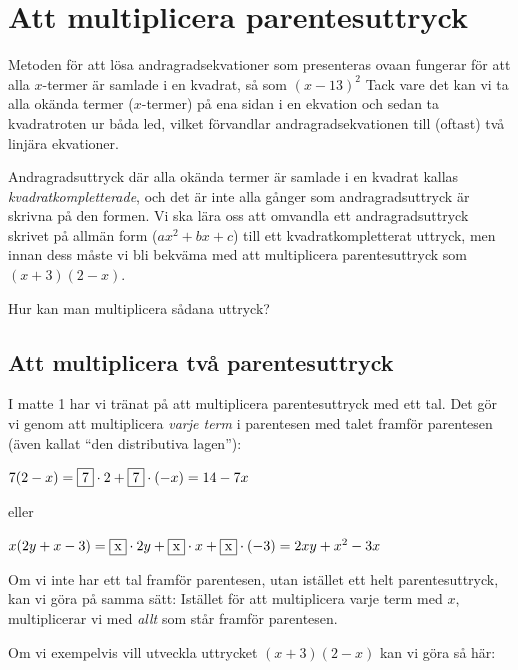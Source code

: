 \section{Att multiplicera parentesuttryck}

Metoden för att lösa andragradsekvationer som presenteras ovaan fungerar för att alla $x$-termer är samlade i en kvadrat, så som $(x - 13)^2$
Tack vare det kan vi ta alla okända termer ($x$-termer) på ena sidan i en ekvation och sedan ta kvadratroten ur båda led, vilket förvandlar andragradsekvationen till (oftast) två linjära ekvationer.

Andragradsuttryck där alla okända termer är samlade i en kvadrat kallas \emph{kvadratkompletterade}, och det är inte alla gånger som andragradsuttryck är skrivna på den formen.
Vi ska lära oss att omvandla ett andragradsuttryck skrivet på allmän form ($ax^2 + bx + c$) till ett kvadratkompletterat uttryck, men innan dess måste vi bli bekväma med att multiplicera parentesuttryck som $(x+3)(2-x)$.

Hur kan man multiplicera sådana uttryck?

\subsection{Att multiplicera två parentesuttryck}

I matte 1 har vi tränat på att multiplicera parentesuttryck med ett tal.
Det gör vi genom att multiplicera \emph{varje term} i parentesen med talet framför parentesen (även kallat ``den distributiva lagen''):

\begin{center}
$7(2-x) = \framebox{7} \cdot 2 + \framebox{7} \cdot (-x) = 14 - 7x$

eller

$x(2y+x-3) = \framebox{x} \cdot 2y + \framebox{x} \cdot x + \framebox{x} \cdot (-3) = 2xy + x^2 - 3x$
\end{center}

Om vi inte har ett tal framför parentesen, utan istället ett helt parentesuttryck, kan vi göra på samma sätt:
Istället för att multiplicera varje term med $x$, multiplicerar vi med \emph{allt} som står framför parentesen.

Om vi exempelvis vill utveckla uttrycket $(x+3)(2-x)$ kan vi göra så här:

